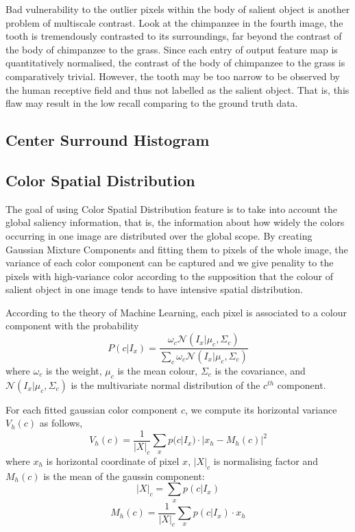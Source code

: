 \documentclass[10pt,twocolumn,letterpaper]{article}
\newcommand{\SUM}{\sum\limits}
\begin{document}
Bad vulnerability to the outlier pixels within the body of salient object is another problem of multiscale contrast. 
Look at the chimpanzee in the fourth image, the tooth is tremendously contrasted to its surroundings,
far beyond the contrast of the body of chimpanzee to the grass. Since each entry of output feature map 
is quantitatively normalised, the contrast of the body of chimpanzee to the grass is comparatively trivial.
However, the tooth may be too narrow to be observed by the human receptive field and thus not 
labelled as the salient object. That is, this flaw may result in the low recall comparing to the ground truth data.

\subsection{Center Surround Histogram}

\subsection{Color Spatial Distribution}
    The goal of using Color Spatial Distribution feature is to take into account the global saliency information, 
    that is, the information about how widely the colors occurring in one image are distributed over the global scope.
    By creating Gaussian Mixture Components and fitting them to pixels of the whole image, the
    variance of each color component can be captured and we give penality to the pixels with high-variance 
    color according to the supposition that the colour of salient object in one image tends to have 
    intensive spatial distribution.
    
    According to the theory of Machine Learning, each pixel is associated to a colour component with the probability
    $$
    P(c|I_x) = \frac{\omega_c\mathcal{N}(I_x|\mu_c,\Sigma_c)}{\SUM_c \omega_c \mathcal{N}(I_x|\mu_c,\Sigma_c)}
    $$
    where $\omega_c$ is the weight, $\mu_c$ is the mean colour, $\Sigma_c$ is the covariance, and $\mathcal N(I_x|\mu_c,\Sigma_c)$ is the multivariate normal distribution of the $c^{th}$ component.

    For each fitted gaussian color component $c$, we compute its horizontal variance $V_{h}(c)$ as follows,
    $$
    V_{h}(c) = \frac{1}{|X|_{c}} \sum_{x} p (c|I_{x}) \cdot | x_{h} - M_{h}(c) |^{2}
    $$
    where $x_h$ is horizontal coordinate of pixel $x$, $|X|_c$ is normalising factor 
    and $M_h (c)$ is the mean of the gaussin component:
    $$
    |X|_c = \sum_x p(c|I_x)
    $$
    $$
    M_h (c) = \frac{1}{|X|_c} \sum_{x} p(c|I_x) \cdot x_h
    $$
\end{document}
